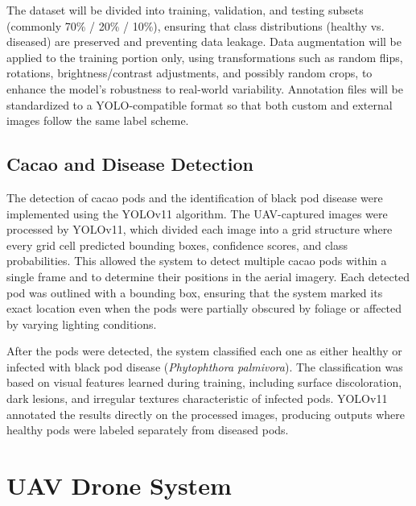 The dataset will be divided into training, validation, and testing subsets (commonly 70\% / 20\% / 10\%), ensuring that class distributions (healthy vs. diseased) are preserved and preventing data leakage. Data augmentation will be applied to the training portion only, using transformations such as random flips, rotations, brightness/contrast adjustments, and possibly random crops, to enhance the model’s robustness to real-world variability. Annotation files will be standardized to a YOLO-compatible format so that both custom and external images follow the same label scheme.

\subsection{Cacao and Disease Detection}

The detection of cacao pods and the identification of black pod disease were implemented using the YOLOv11 algorithm. The UAV-captured images were processed by YOLOv11, which divided each image into a grid structure where every grid cell predicted bounding boxes, confidence scores, and class probabilities. This allowed the system to detect multiple cacao pods within a single frame and to determine their positions in the aerial imagery. Each detected pod was outlined with a bounding box, ensuring that the system marked its exact location even when the pods were partially obscured by foliage or affected by varying lighting conditions.

After the pods were detected, the system classified each one as either healthy or infected with black pod disease (\textit{Phytophthora palmivora}). The classification was based on visual features learned during training, including surface discoloration, dark lesions, and irregular textures characteristic of infected pods. YOLOv11 annotated the results directly on the processed images, producing outputs where healthy pods were labeled separately from diseased pods.


\section{UAV Drone System}

